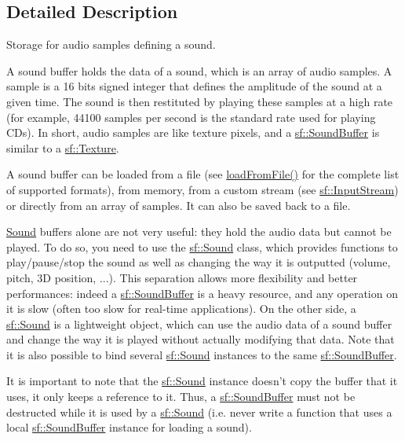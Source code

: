 \subsection{Detailed Description}
Storage for audio samples defining a sound. 

A sound buffer holds the data of a sound, which is an array of audio samples. A sample is a 16 bits signed integer that defines the amplitude of the sound at a given time. The sound is then restituted by playing these samples at a high rate (for example, 44100 samples per second is the standard rate used for playing C\-Ds). In short, audio samples are like texture pixels, and a \hyperlink{classsf_1_1SoundBuffer}{sf\-::\-Sound\-Buffer} is similar to a \hyperlink{classsf_1_1Texture}{sf\-::\-Texture}.

A sound buffer can be loaded from a file (see \hyperlink{classsf_1_1SoundBuffer_a2be6a8025c97eb622a7dff6cf2594394}{load\-From\-File()} for the complete list of supported formats), from memory, from a custom stream (see \hyperlink{classsf_1_1InputStream}{sf\-::\-Input\-Stream}) or directly from an array of samples. It can also be saved back to a file.

\hyperlink{classsf_1_1Sound}{Sound} buffers alone are not very useful\-: they hold the audio data but cannot be played. To do so, you need to use the \hyperlink{classsf_1_1Sound}{sf\-::\-Sound} class, which provides functions to play/pause/stop the sound as well as changing the way it is outputted (volume, pitch, 3\-D position, ...). This separation allows more flexibility and better performances\-: indeed a \hyperlink{classsf_1_1SoundBuffer}{sf\-::\-Sound\-Buffer} is a heavy resource, and any operation on it is slow (often too slow for real-\/time applications). On the other side, a \hyperlink{classsf_1_1Sound}{sf\-::\-Sound} is a lightweight object, which can use the audio data of a sound buffer and change the way it is played without actually modifying that data. Note that it is also possible to bind several \hyperlink{classsf_1_1Sound}{sf\-::\-Sound} instances to the same \hyperlink{classsf_1_1SoundBuffer}{sf\-::\-Sound\-Buffer}.

It is important to note that the \hyperlink{classsf_1_1Sound}{sf\-::\-Sound} instance doesn't copy the buffer that it uses, it only keeps a reference to it. Thus, a \hyperlink{classsf_1_1SoundBuffer}{sf\-::\-Sound\-Buffer} must not be destructed while it is used by a \hyperlink{classsf_1_1Sound}{sf\-::\-Sound} (i.\-e. never write a function that uses a local \hyperlink{classsf_1_1SoundBuffer}{sf\-::\-Sound\-Buffer} instance for loading a sound).

